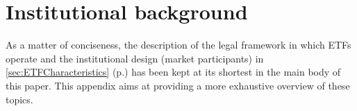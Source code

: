 \section{Institutional background}
\label{app:sec:InstitutionalBackground}
As a matter of conciseness, the description of the legal framework in which ETFs operate and the institutional design (market participants) in \autoref{sec:ETFCharacteristics} (p.\pageref{sec:ETFCharacteristics}) has been kept at its shortest in the main body of this paper. This appendix aims at providing a more exhaustive overview of these topics.
